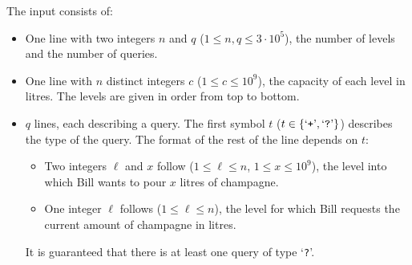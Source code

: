 
The input consists of:
\begin{itemize}
    \item One line with two integers $n$ and $q$ ($1\leq n, q \leq 3 \cdot 10^5$), the number of levels and the number of queries.
    \item One line with $n$ distinct integers $c$ ($1\leq c \leq 10^9$), the capacity of each level in litres.
    The levels are given in order from top to bottom.
    \item $q$ lines, each describing a query.
    The first symbol $t$ ($t \in \{\text{`\texttt{+}'}, \text{`\texttt{?}'}\}$) describes the type of the query.
    The format of the rest of the line depends on $t$:
    \begin{itemize}[leftmargin=1.95cm]
	    \item[$t=\text{`\texttt{+}'}$:] Two integers $\ell$ and $x$ follow ($1 \leq \ell \leq n$, $1 \leq x \leq 10^9$), the level into which Bill wants to pour $x$ litres of champagne.
	    \item[$t=\text{`\texttt{?}'}$:] One integer $\ell$ follows ($1 \leq \ell \leq n$), the level for which Bill requests the current amount of champagne in litres.
    \end{itemize}
    It is guaranteed that there is at least one query of type `\texttt{?}'.
\end{itemize}

